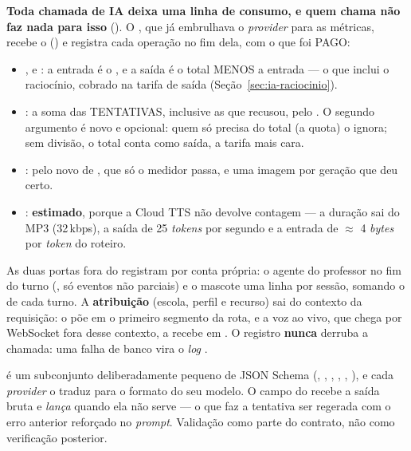 \begin{regra}
\textbf{Toda chamada de IA deixa uma linha de consumo, e quem chama não faz
nada para isso} (). O , que já embrulhava o
\emph{provider} para as métricas, recebe o 
() e registra cada operação no fim dela, com o que foi
PAGO:
\begin{itemize}
  \item {},  e : a entrada é o
    , e a saída é o total MENOS a entrada --- o que inclui
    o raciocínio, cobrado na tarifa de saída (Seção~\ref{sec:ia-raciocinio}).
  \item {}: a soma das TENTATIVAS, inclusive as que 
    recusou, pelo . O segundo argumento é
    novo e opcional: quem só precisa do total (a quota) o ignora; sem divisão,
    o total conta como saída, a tarifa mais cara.
  \item {}: pelo  novo de ,
    que só o medidor passa, e uma imagem por geração que deu certo.
  \item {}: \textbf{estimado}, porque a Cloud TTS não devolve
    contagem --- a duração sai do MP3 (32\,kbps), a saída de 25 \emph{tokens}
    por segundo e a entrada de $\approx$ 4 \emph{bytes} por \emph{token} do
    roteiro.
\end{itemize}
As duas portas fora do  registram por conta própria: o agente do
professor no fim do turno (, só eventos não parciais) e o
mascote uma linha por sessão, somando o  de cada turno. A
\textbf{atribuição} (escola, perfil e recurso) sai do contexto da requisição: o
 põe em  o primeiro
segmento da rota, e a voz ao vivo, que chega por WebSocket fora desse contexto,
a recebe em . O registro \textbf{nunca} derruba a
chamada: uma falha de banco vira o \emph{log} .
\end{regra}

\begin{nota}
 é um subconjunto deliberadamente pequeno de JSON Schema
(, , , , , ), e
cada \emph{provider} o traduz para o formato do seu modelo. O campo
 do  recebe a saída bruta e \emph{lança} quando ela
não serve --- o que faz a tentativa ser regerada com o erro anterior reforçado no
\emph{prompt}. Validação como parte do contrato, não como verificação posterior.
\end{nota}


